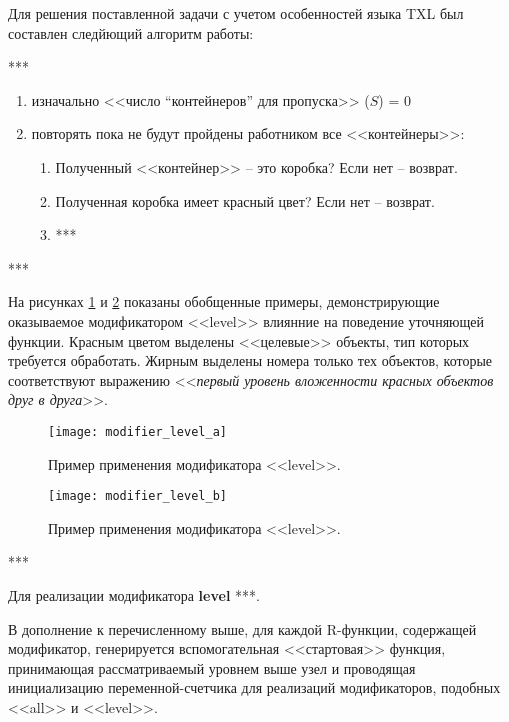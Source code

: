 Для решения поставленной задачи с учетом особенностей языка TXL был составлен следйющий алгоритм работы:

***

\begin{enumerate}[noitemsep]
  \item изначально <<число ``контейнеров'' для пропуска>> ($S$) = 0
  
  \item повторять пока не будут пройдены работником все <<контейнеры>>:
    \begin{enumerate}[noitemsep,label*=\arabic*]
      \item Полученный <<контейнер>> -- это коробка? Если нет -- возврат.
      \item Полученная коробка имеет красный цвет? Если нет -- возврат.
      \item ***
    \end{enumerate}
\end{enumerate}

***

На рисунках \ref{fig:modifier_level_a} и \ref{fig:modifier_level_b} показаны обобщенные примеры, демонстрирующие оказываемое модификатором <<level>> влиянние на поведение уточняющей функции.
Красным цветом выделены <<целевые>> объекты, тип которых требуется обработать.
Жирным выделены номера только тех объектов, которые соответствуют выражению <<\textit{первый уровень вложенности красных объектов друг в друга}>>.

\begin{figure}[!h]
  \centering
  \texttt{[image: modifier\_level\_a]}
  \caption{Пример применения модификатора <<level>>.}
  \label{fig:modifier_level_a}
\end{figure}

\begin{figure}[!h]
  \centering
  \texttt{[image: modifier\_level\_b]}
  \caption{Пример применения модификатора <<level>>.}
  \label{fig:modifier_level_b}
\end{figure}

***

Для реализации модификатора \textbf{level} ***.

В дополнение к перечисленному выше, для каждой R-функции, содержащей модификатор, генерируется вспомогательная <<стартовая>> функция, принимающая рассматриваемый уровнем выше узел и проводящая инициализацию переменной-счетчика для реализаций модификаторов, подобных <<all>> и <<level>>.


